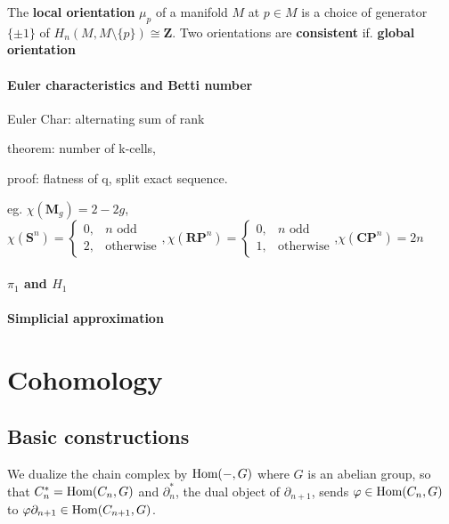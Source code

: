 \documentclass[11pt]{article}
\theoremstyle{definition}
\theoremstyle{plain}
\newcommand{\Z}{\mathbf{Z}}
\newcommand{\Hom}{\textup{Hom}}
\newcommand{\1}{\mathbf{1}}
\begin{document}
The \textbf{local orientation} $\mu_p$ of a manifold $M$ at $p\in M$ is a choice of generator $\{\pm1\}$ of $H_n(M,M\setminus\{p\})\cong\Z$. Two orientations are \textbf{consistent} if. \textbf{global orientation}

\paragraph{Euler characteristics and Betti number}

Euler Char: alternating sum of rank

theorem: number of k-cells,

proof: flatness of q, split exact sequence.

eg. $\chi(\mathbf{M}_g)=2-2g$, $\chi(\mathbf{S}^n)=\begin{cases}0,&n\textrm{ odd}\\2,&\textrm{otherwise}
\end{cases},\chi(\mathbf{RP}^n)=\begin{cases}0,&n\textrm{ odd}\\1,&\textrm{otherwise}
\end{cases}$,$\chi(\mathbf{CP}^n)=2n$

\paragraph{$\pi_1$ and $H_1$}

\paragraph{Simplicial approximation}

\newpage
\section{Cohomology}

\subsection{Basic constructions}

We dualize the chain complex by $\Hom(-,G)$ where $G$ is an abelian group, so that $C^\ast_n=\Hom(C_n,G)$ and $\partial_n^\ast$, the dual object of $\partial_{n+1}$, sends $\varphi\in\Hom(C_n,G)$ to $\varphi\partial_{n+1}\in\Hom(C_{n+1},G)$.
\begin{center}\end{center}
\end{document}
